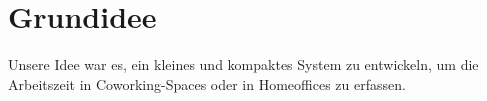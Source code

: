 \documentclass[../main.tex]{subfiles}
\begin{document}
\section{Grundidee}

Unsere Idee war es, ein kleines und kompaktes System zu entwickeln, um die Arbeitszeit in Coworking-Spaces oder in Homeoffices zu erfassen. %
\end{document}
